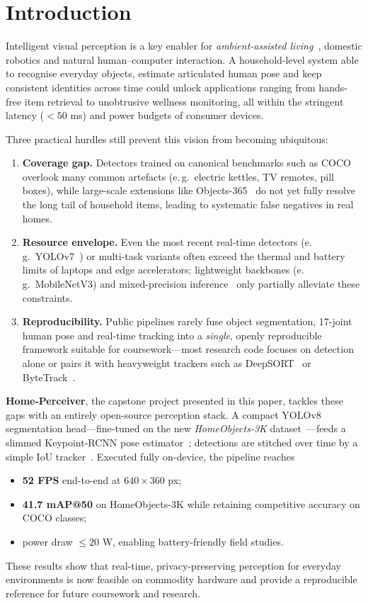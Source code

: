 \section{Introduction}

Intelligent visual perception is a key enabler for \emph{ambient-assisted living}~\cite{cook2009ambient}, domestic robotics and natural human–computer interaction.  
A household-level system able to recognise everyday objects, estimate articulated human pose and keep consistent identities across time could unlock applications ranging from hands-free item retrieval to unobtrusive wellness monitoring, all within the stringent latency ($<\!50$ ms) and power budgets of consumer devices.

Three practical hurdles still prevent this vision from becoming ubiquitous:
\begin{enumerate}
  \item \textbf{Coverage gap.} Detectors trained on canonical benchmarks such as COCO ~\cite{lin2014microsoft} overlook many common artefacts (e.\,g.\ electric kettles, TV remotes, pill boxes), while large-scale extensions like Objects-365~\cite{shao2019objects365} do not yet fully resolve the long tail of household items, leading to systematic false negatives in real homes.
  \item \textbf{Resource envelope.} Even the most recent real-time detectors (e.\,g.\ YOLOv7~\cite{wang2022yolov7}) or multi-task variants often exceed the thermal and battery limits of laptops and edge accelerators; lightweight backbones (e.\,g.\ MobileNetV3) and mixed-precision inference~\cite{micikevicius2018mixed} only partially alleviate these constraints.
  \item \textbf{Reproducibility.} Public pipelines rarely fuse object segmentation, 17-joint human pose and real-time tracking into a \emph{single}, openly reproducible framework suitable for coursework—most research code focuses on detection alone or pairs it with heavyweight trackers such as DeepSORT~\cite{wojke2017simple} or ByteTrack~\cite{zhang2022bytetrack}.
\end{enumerate}

\noindent\textbf{Home-Perceiver}, the capstone project presented in this paper, tackles these gaps with an entirely open-source perception stack.  
A compact YOLOv8 segmentation head—fine-tuned on the new \emph{HomeObjects-3K} dataset~\cite{tangaro2025homeobjects3k}—feeds a slimmed Keypoint-RCNN pose estimator~\cite{he2017maskrcnn}; detections are stitched over time by a simple IoU tracker~\cite{bochinski2017high}.  
Executed fully on-device, the pipeline reaches
\begin{itemize}
  \item \textbf{52 FPS} end-to-end at $640\!\times\!360$ px;
  \item \textbf{41.7 mAP@50} on HomeObjects-3K while retaining competitive accuracy on COCO classes;
  \item power draw $\leq\!20$ W, enabling battery-friendly field studies.
\end{itemize}

These results show that real-time, privacy-preserving perception for everyday environments is now feasible on commodity hardware and provide a reproducible reference for future coursework and research.

